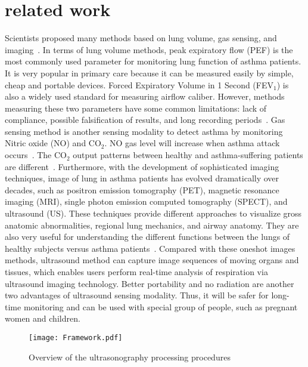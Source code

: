 \section{related work} \label{sec.relatedwork}
Scientists proposed many methods based on lung volume, gas sensing, and imaging~\cite{Lorenzo:2013}.
In terms of lung volume methods, peak expiratory flow (PEF) is the most commonly used parameter for monitoring lung function of asthma patients. It is very popular in primary care because it can be measured easily by simple, cheap and portable devices. Forced Expiratory Volume in 1 Second (FEV$_1$) is also a widely used standard for  measuring airflow caliber. However, methods measuring these two parameters have some common limitations: lack of compliance, possible falsification of results, and long recording periods~\cite{Moscato:1995}.
Gas sensing method is another sensing modality to detect asthma by monitoring Nitric oxide (NO) and CO$_2$. NO gas level will increase when asthma attack occurs~\cite{Kharitonov:1994}. The CO$_2$ output patterns between healthy and asthma-suffering patients are different~\cite{You:1994}.
Furthermore, with the development of sophisticated imaging techniques, image of lung in asthma patients has evolved dramatically over decades, such as positron emission tomography (PET), magnetic resonance imaging (MRI), single photon emission computed tomography (SPECT), and ultrasound (US). These techniques provide different approaches to visualize gross anatomic abnormalities, regional lung mechanics, and airway anatomy. They are also very useful for understanding the different functions between the lungs of healthy subjects versus asthma patients~\cite{Mario:2011}.
Compared with these oneshot images methods, ultrasound method can capture image sequences of moving organs and tissues, which enables users perform real-time analysis of respiration via ultrasound imaging technology. Better portability and no radiation are another two advantages of ultrasound sensing modality. Thus, it will be safer for long-time monitoring and can be used with special group of people, such as pregnant women and children.
\begin{figure*}[htb]
\centering
\texttt{[image: Framework.pdf]}
\caption{Overview of the ultrasonography processing procedures}
\label{fig.System}
\end{figure*}

